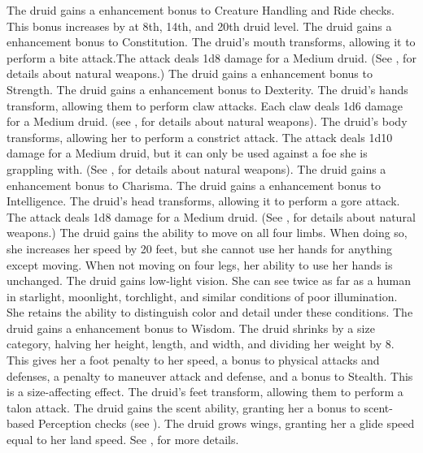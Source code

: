  The druid gains a  enhancement bonus to Creature Handling and Ride checks. This bonus increases by  at 8th, 14th, and 20th druid level.
 The druid gains a  enhancement bonus to Constitution.
 The druid's mouth transforms, allowing it to perform a bite attack.The attack deals 1d8 damage for a Medium druid. (See , for details about natural weapons.)
 The druid gains a  enhancement bonus to Strength.
 The druid gains a  enhancement bonus to Dexterity.
 The druid's hands transform, allowing them to perform claw attacks. Each claw deals 1d6 damage for a Medium druid. (see , for details about natural weapons).
 The druid's body transforms, allowing her to perform a constrict attack. The attack deals 1d10 damage for a Medium druid, but it can only be used against a foe she is grappling with. (See , for details about natural weapons). 
 The druid gains a  enhancement bonus to Charisma.
 The druid gains a  enhancement bonus to Intelligence.
 The druid's head transforms, allowing it to perform a gore attack. The attack deals 1d8 damage for a Medium druid. (See , for details about natural weapons.)
 The druid gains the ability to move on all four limbs. When doing so, she increases her speed by 20 feet, but she cannot use her hands for anything except moving. When not moving on four legs, her ability to use her hands is unchanged.
 The druid gains low-light vision. She can see twice as far as a human in starlight, moonlight, torchlight, and similar conditions of poor illumination. She retains the ability to distinguish color and detail under these conditions.
 The druid gains a  enhancement bonus to Wisdom.
 The druid shrinks by a size category, halving her height, length, and width, and dividing her weight by 8. This gives her a  foot penalty to her speed, a  bonus to physical attacks and defenses, a  penalty to maneuver attack and defense, and a  bonus to Stealth. This is a size-affecting effect.
 The druid's feet transform, allowing them to perform a talon attack.
 The druid gains the scent ability, granting her a  bonus to scent-based Perception checks (see ).
 The druid grows wings, granting her a glide speed equal to her land speed. See , for more details.
